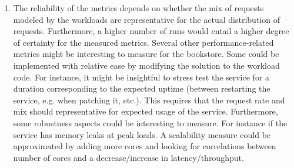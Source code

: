 \documentclass[11pt,a4paper,english]{article}
\begin{document}
\begin{enumerate}
\item The reliability of the metrics depends on whether the mix of requests modeled by the workloads are representative for the actual distribution of requests. Furthermore, a higher number of runs would entail a higher degree of certainty for the measured metrics. Several other performance-related metrics might be interesting to measure for the bookstore. Some could be implemented with relative ease by modifying the solution to the workload code. For instance, it might be insightful to stress test the service for a duration corresponding to the expected uptime (between restarting the service, e.g. when patching it, etc.). This requires that the request rate and mix should representative for expected usage of the service. Furthermore, some robustness aspects could be interesting to measure. For instance if the service has memory leaks at peak loads. A scalability measure could be approximated by adding more cores and looking for correlations between number of cores and a decrease/increase in latency/throughput.
\end{enumerate}
\end{document}
